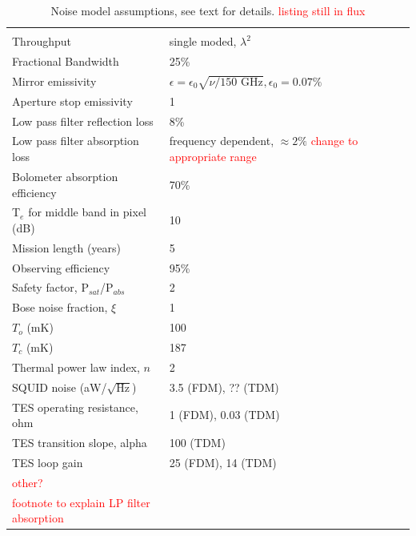 \documentclass[]{spie}  %
\newcommand{\comr}[1]{\textcolor{red}{#1}}
\begin{document}
\begin{table}[ht]
\centering
\caption{Noise model assumptions, see text for details. \comr{listing still in flux}}
\label{tab:assume}
%
\begin{tabular}{|l|l|}
\hline
                                 &                                                  \\
Throughput                       & single moded, $\lambda^2$          \\
Fractional Bandwidth             & 25\%                                             \\
Mirror emissivity                & $\epsilon = \epsilon_0\sqrt{\nu/\text{150~GHz}}, \epsilon_0 = 0.07\%$ \\
Aperture stop emissivity         & 1                                                \\
Low pass filter reflection loss  & 8\%                                                \\
Low pass filter absorption loss  & frequency dependent, $\approx 2\%  $ \comr{change to appropriate range}             \\
Bolometer absorption efficiency  & 70\%                                             \\
T$_e$ for middle band in pixel (dB) & 10                                               \\
Mission length (years)           & 5                                                \\
Observing efficiency             & 95\%                                             \\
Safety factor, P$_{sat}$/P$_{abs}$      & 2                                                \\
Bose noise fraction, $\xi$       & 1                                                \\
$T_o$ (mK)                      & 100                                              \\
$T_c$ (mK)                      & 187                                              \\
Thermal power law index, $n$    & 2                                                \\
SQUID noise (aW/$\sqrt{\text{Hz}}$)   & 3.5    (FDM), ?? (TDM)                       \\
TES operating resistance, ohm    & 1 (FDM), 0.03 (TDM)                              \\
TES transition slope, alpha      & 100 (TDM)                                        \\
TES loop gain                    & 25 (FDM), 14 (TDM)                               \\
\comr{other?}                    &                                                  \\
\comr{\footnotesize footnote to explain LP filter absorption}  &                                                  \\ \hline
\end{tabular}
\end{table}
\end{document}
